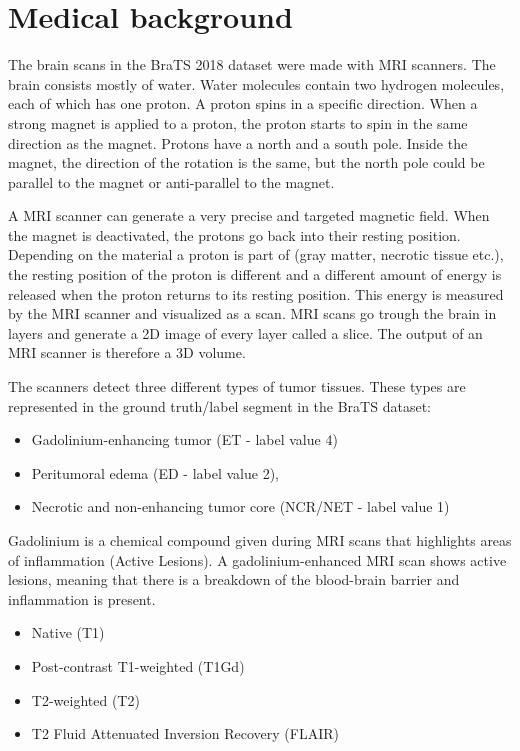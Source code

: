 \section{Medical background}
The brain scans in the BraTS\cite{menze2015multimodal} 2018 dataset were made with MRI scanners\cite{mriscanner}.
The brain consists mostly of water. Water molecules contain two hydrogen molecules, each of which has one proton. A proton spins in a specific direction. When a strong magnet is applied to a proton, the proton starts to spin in the same direction as the magnet. Protons have a north and a south pole. Inside the magnet, the direction of the rotation is the same, but the north pole could be parallel to the magnet or anti-parallel to the magnet.

A MRI scanner can generate a very precise and targeted magnetic field. When the magnet is deactivated, the protons go back into their resting position. Depending on the material a proton is part of (gray matter, necrotic tissue etc.), the resting position of the proton is different and a different amount of energy is released when the proton returns to its resting position. This energy is measured by the MRI scanner and visualized as a scan. MRI scans go trough the brain in layers and generate a 2D image of every layer called a slice. The output of an MRI scanner is therefore a 3D volume.

The scanners detect three different types of tumor tissues. These types are represented in the ground truth/label segment in the BraTS dataset:

\begin{itemize}
    \item Gadolinium-enhancing tumor (ET - label value 4)
    \item Peritumoral edema (ED - label value 2),
    \item Necrotic and non-enhancing tumor core (NCR/NET - label value 1)
\end{itemize}


Gadolinium is a chemical compound given during MRI scans that highlights areas of inflammation (Active Lesions). A gadolinium-enhanced  MRI scan shows active lesions, meaning that there is a breakdown of the blood-brain barrier and inflammation is present.


\begin{itemize}
    \item Native (T1)
    \item Post-contrast T1-weighted (T1Gd)
    \item T2-weighted (T2)
    \item T2 Fluid Attenuated Inversion Recovery (FLAIR)
\end{itemize}
